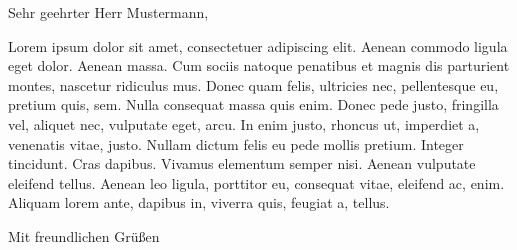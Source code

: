 \documentclass[guides]{../onlinebrief24}
\begin{document}
\begin{letter}{}

\opening{Sehr geehrter Herr Mustermann,}

Lorem ipsum dolor sit amet, consectetuer adipiscing elit. Aenean commodo ligula eget dolor. Aenean massa. Cum sociis natoque penatibus et magnis dis parturient montes, nascetur ridiculus mus. Donec quam felis, ultricies nec, pellentesque eu, pretium quis, sem. Nulla consequat massa quis enim. Donec pede justo, fringilla vel, aliquet nec, vulputate eget, arcu. In enim justo, rhoncus ut, imperdiet a, venenatis vitae, justo. Nullam dictum felis eu pede mollis pretium. Integer tincidunt. Cras dapibus. Vivamus elementum semper nisi. Aenean vulputate eleifend tellus. Aenean leo ligula, porttitor eu, consequat vitae, eleifend ac, enim. Aliquam lorem ante, dapibus in, viverra quis, feugiat a, tellus.

\closing{Mit freundlichen Grüßen}

\end{letter}
\end{document}
